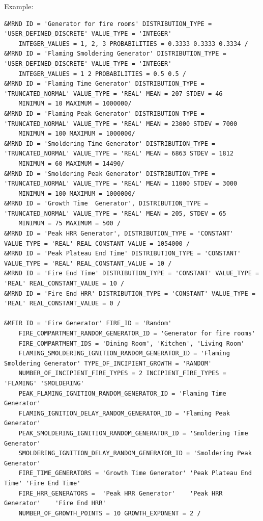 \documentclass[12pt,twoside]{book}
\begin{document}
\vspace{\baselineskip}
\noindent Example:
\begin{lstlisting}
&MRND ID = 'Generator for fire rooms' DISTRIBUTION_TYPE = 'USER_DEFINED_DISCRETE' VALUE_TYPE = 'INTEGER'
    INTEGER_VALUES = 1, 2, 3 PROBABILITIES = 0.3333 0.3333 0.3334 /
&MRND ID = 'Flaming Smoldering Generator' DISTRIBUTION_TYPE = 'USER_DEFINED_DISCRETE' VALUE_TYPE = 'INTEGER'
    INTEGER_VALUES = 1 2 PROBABILITIES = 0.5 0.5 /
&MRND ID = 'Flaming Time Generator' DISTRIBUTION_TYPE = 'TRUNCATED_NORMAL' VALUE_TYPE = 'REAL' MEAN = 207 STDEV = 46
    MINIMUM = 10 MAXIMUM = 1000000/
&MRND ID = 'Flaming Peak Generator' DISTRIBUTION_TYPE = 'TRUNCATED_NORMAL' VALUE_TYPE = 'REAL' MEAN = 23000 STDEV = 7000
    MINIMUM = 100 MAXIMUM = 1000000/
&MRND ID = 'Smoldering Time Generator' DISTRIBUTION_TYPE = 'TRUNCATED_NORMAL' VALUE_TYPE = 'REAL' MEAN = 6863 STDEV = 1812
    MINIMUM = 60 MAXIMUM = 14490/
&MRND ID = 'Smoldering Peak Generator' DISTRIBUTION_TYPE = 'TRUNCATED_NORMAL' VALUE_TYPE = 'REAL' MEAN = 11000 STDEV = 3000
    MINIMUM = 100 MAXIMUM = 1000000/
&MRND ID = 'Growth Time  Generator', DISTRIBUTION_TYPE = 'TRUNCATED_NORMAL' VALUE_TYPE = 'REAL' MEAN = 205, STDEV = 65
    MINIMUM = 75 MAXIMUM = 500 /
&MRND ID = 'Peak HRR Generator', DISTRIBUTION_TYPE = 'CONSTANT' VALUE_TYPE = 'REAL' REAL_CONSTANT_VALUE = 1054000 /
&MRND ID = 'Peak Plateau End Time' DISTRIBUTION_TYPE = 'CONSTANT' VALUE_TYPE = 'REAL' REAL_CONSTANT_VALUE = 10 /
&MRND ID = 'Fire End Time' DISTRIBUTION_TYPE = 'CONSTANT' VALUE_TYPE = 'REAL' REAL_CONSTANT_VALUE = 10 /
&MRND ID = 'Fire End HRR' DISTRIBUTION_TYPE = 'CONSTANT' VALUE_TYPE = 'REAL' REAL_CONSTANT_VALUE = 0 /

&MFIR ID = 'Fire Generator' FIRE_ID = 'Random'
    FIRE_COMPARTMENT_RANDOM_GENERATOR_ID = 'Generator for fire rooms'
    FIRE_COMPARTMENT_IDS = 'Dining Room', 'Kitchen', 'Living Room'
    FLAMING_SMOLDERING_IGNITION_RANDOM_GENERATOR_ID = 'Flaming Smoldering Generator' TYPE_OF_INCIPIENT_GROWTH = 'RANDOM'
    NUMBER_OF_INCIPIENT_FIRE_TYPES = 2 INCIPIENT_FIRE_TYPES = 'FLAMING' 'SMOLDERING'
    PEAK_FLAMING_IGNITION_RANDOM_GENERATOR_ID = 'Flaming Time Generator'
    FLAMING_IGNITION_DELAY_RANDOM_GENERATOR_ID = 'Flaming Peak Generator'
    PEAK_SMOLDERING_IGNITION_RANDOM_GENERATOR_ID = 'Smoldering Time Generator'
    SMOLDERING_IGNITION_DELAY_RANDOM_GENERATOR_ID = 'Smoldering Peak Generator'
    FIRE_TIME_GENERATORS = 'Growth Time Generator' 'Peak Plateau End Time' 'Fire End Time'
    FIRE_HRR_GENERATORS =  'Peak HRR Generator'    'Peak HRR Generator'    'Fire End HRR'
    NUMBER_OF_GROWTH_POINTS = 10 GROWTH_EXPONENT = 2 /
\end{lstlisting}
\end{document}

